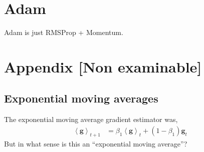 \documentclass{article}
\newcommand{\bracket}[3]{\left#1 #3 \right#2}
\newcommand{\ab}{\bracket{\langle}{\rangle}}
\newcommand{\0}{\mathbf{0}}
\newcommand{\g}{\mathbf{g}}
\newcommand{\gb}{\mathbf{\ab{g}}}
\begin{document}
\section{Adam}

Adam is just RMSProp + Momentum.


\section{Appendix [Non examinable]}

\subsection{Exponential moving averages}
The exponential moving average gradient estimator was,
\begin{align}
  \gb_{t+1} &= \beta_1 \gb_t + (1-\beta_1) \g_t
\end{align}
But in what sense is this an ``exponential moving average''?
\end{document}
